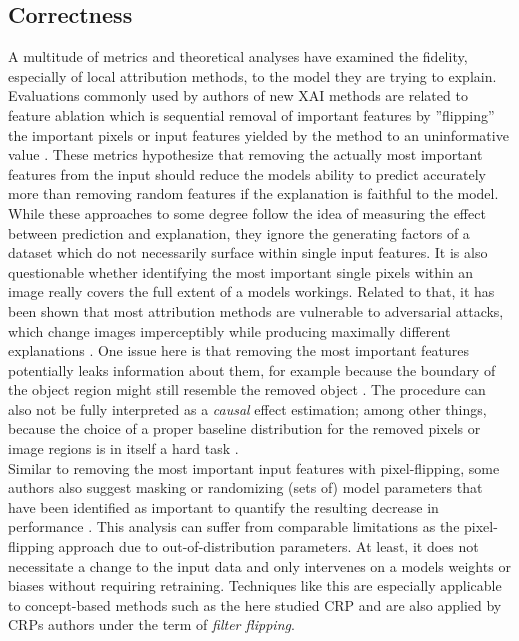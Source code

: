 \subsection{Correctness}
A multitude of metrics and theoretical analyses have examined the fidelity, especially of local attribution methods, to the model they are trying to explain. Evaluations commonly used by authors of new XAI methods are related to feature ablation which is sequential removal of important features by ''flipping'' the important pixels or input features yielded by the method to an uninformative value \cite{Samek2017a}. 
These metrics hypothesize that removing the actually most important features from the input should reduce the models ability to predict accurately more than removing random features if the explanation is faithful to the model.\\

While these approaches to some degree follow the idea of measuring the effect between prediction and explanation, they ignore the generating factors of a dataset which do not necessarily surface within single input features. It is also questionable whether identifying the most important single pixels within an image really covers the full extent of a models workings. Related to that, it has been shown that most attribution methods are vulnerable to adversarial attacks, which change images imperceptibly while producing maximally different explanations \cite{Ghorbani2019a, Anders2020, Dombrowski2022,Dombrowski2019}. One issue here is that removing the most important features potentially leaks information about them, for example because the boundary of the object region might still resemble the removed object \cite{Rong2022}.
The procedure can also not be fully interpreted as a \textit{causal} effect estimation; among other things, because the choice of a proper baseline distribution for the removed pixels or image regions is in itself a hard task \cite{Chang2019,Hooker2019, Popescu2021, Rong2022}. \\

Similar to removing the most important input features with pixel-flipping, some authors also suggest masking or randomizing (sets of) model parameters that have been identified as important to quantify the resulting decrease in performance \cite{Ghorbani2019,Zhang2021,Achtibat2022, Fel2023}. 
This analysis can suffer from comparable limitations as the pixel-flipping approach due to out-of-distribution parameters. At least, it does not necessitate a change to the input data and only intervenes on a models weights or biases without requiring retraining.
Techniques like this are especially applicable to concept-based methods such as the here studied CRP and are also applied by CRPs authors under the term of \textit{filter flipping}. \\

